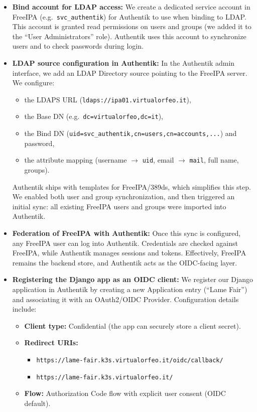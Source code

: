 \begin{itemize}
	\item \textbf{Bind account for LDAP access:}  
	We create a dedicated service account in FreeIPA (e.g.\ \texttt{svc\_authentik}) for Authentik to use when binding to LDAP. This account is granted read permissions on users and groups (we added it to the ``User Administrators'' role). Authentik uses this account to synchronize users and to check passwords during login.  
	
	\item \textbf{LDAP source configuration in Authentik:}  
	In the Authentik admin interface, we add an LDAP Directory source pointing to the FreeIPA server. We configure:  
	\begin{itemize}
		\item the LDAPS URL (\texttt{ldaps://ipa01.virtualorfeo.it}),  
		\item the Base DN (e.g.\ \texttt{dc=virtualorfeo,dc=it}),  
		\item the Bind DN (\texttt{uid=svc\_authentik,cn=users,cn=accounts,...}) and password,  
		\item the attribute mapping (username $\rightarrow$ \texttt{uid}, email $\rightarrow$ \texttt{mail}, full name, groups).  
	\end{itemize}  
	Authentik ships with templates for FreeIPA/389ds, which simplifies this step. We enabled both user and group synchronization, and then triggered an initial sync: all existing FreeIPA users and groups were imported into Authentik.  
	
	\item \textbf{Federation of FreeIPA with Authentik:}  
	Once this sync is configured, any FreeIPA user can log into Authentik. Credentials are checked against FreeIPA, while Authentik manages sessions and tokens. Effectively, FreeIPA remains the backend store, and Authentik acts as the OIDC-facing layer.  
	
	\item \textbf{Registering the Django app as an OIDC client:}  
	We register our Django application in Authentik by creating a new Application entry (``Lame Fair'') and associating it with an OAuth2/OIDC Provider. Configuration details include:  
	\begin{itemize}
		\item \textbf{Client type:} Confidential (the app can securely store a client secret).  
		\item \textbf{Redirect URIs:}  
		\begin{itemize}
			\item \texttt{https://lame-fair.k3s.virtualorfeo.it/oidc/callback/}
			\item \texttt{https://lame-fair.k3s.virtualorfeo.it/}
		\end{itemize}
		\item \textbf{Flow:} Authorization Code flow with explicit user consent (OIDC default).  
	\end{itemize}
	

\end{itemize}

